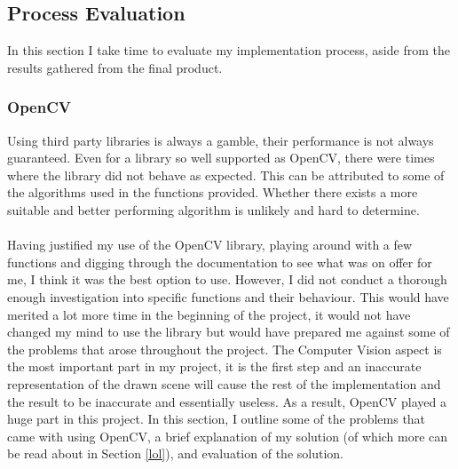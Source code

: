 \documentclass[11pt]{article}
\begin{document}
\subsection{Process Evaluation}
In this section I take time to evaluate my implementation process, aside
from the results gathered from the final product.

\subsubsection{OpenCV}
Using third party libraries is always a gamble, their performance is not
always guaranteed. Even for a library so well supported as OpenCV, there 
were times where the library did not behave as expected. This can be 
attributed to some of the algorithms used in the functions provided. 
Whether there exists a more suitable and better performing algorithm is
unlikely and hard to determine.\\
\\
Having justified my use of the OpenCV library, playing around with a 
few functions and digging through the documentation to see what was
on offer for me, I think it was the best option to use. 
However, I did not conduct a thorough enough investigation into specific
functions and their behaviour. This would have merited a lot more time in 
the beginning of the project, it would not have changed my mind to  use
the library but would have prepared me against some of the problems that 
arose throughout the project. The Computer Vision aspect is the most
important part in my project, it is the first step and an inaccurate
representation of the drawn scene will cause the rest of the 
implementation and the result to be inaccurate and essentially useless. As
a result, OpenCV played a huge part in this project. 
In this section, I outline some of the
problems that came with using OpenCV, a brief explanation of my solution
(of which more can be read about in Section \ref{lol}), and evaluation of
the solution. 
\end{document}
